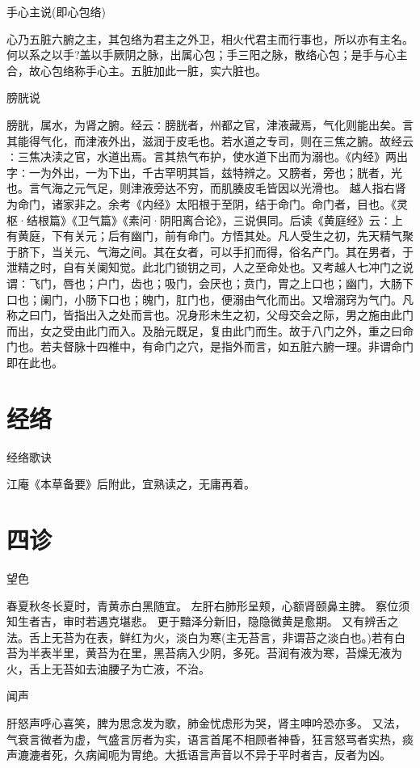 \documentclass[a4paper,12pt,UTF8,twoside]{ctexbook}
\begin{document}
	手心主说(即心包络)	
  
  心乃五脏六腑之主，其包络为君主之外卫，相火代君主而行事也，所以亦有主名。何以系之以手?盖以手厥阴之脉，出属心包；手三阳之脉，散络心包；是手与心主合，故心包络称手心主。五脏加此一脏，实六脏也。
	
	膀胱说

	膀胱，属水，为肾之腑。经云∶膀胱者，州都之官，津液藏焉，气化则能出矣。言其能得气化，而津液外出，滋润于皮毛也。若水道之专司，则在三焦之腑。故经云∶三焦决渎之官，水道出焉。言其热气布护，使水道下出而为溺也。《内经》两出字∶一为外出，一为下出，千古罕明其旨，兹特辨之。又膀者，旁也；胱者，光也。言气海之元气足，则津液旁达不穷，而肌腠皮毛皆因以光滑也。
	越人指右肾为命门，诸家非之。余考《内经》太阳根于至阴，结于命门。命门者，目也。《灵枢·结根篇》《卫气篇》《素问·阴阳离合论》，三说俱同。后读《黄庭经》云∶上有黄庭，下有关元；后有幽门，前有命门。方悟其处。凡人受生之初，先天精气聚于脐下，当关元、气海之间。其在女者，可以手扪而得，俗名产门。其在男者，于泄精之时，自有关阑知觉。此北门锁钥之司，人之至命处也。又考越人七冲门之说谓∶飞门，唇也；户门，齿也；吸门，会厌也；贲门，胃之上口也；幽门，大肠下口也；阑门，小肠下口也；魄门，肛门也，便溺由气化而出。又增溺窍为气门。凡称之曰门，皆指出入之处而言也。况身形未生之初，父母交会之际，男之施由此门而出，女之受由此门而入。及胎元既足，复由此门而生。故于八门之外，重之曰命门也。若夫督脉十四椎中，有命门之穴，是指外而言，如五脏六腑一理。非谓命门即在此也。
	
	\chapter{经络}
  经络歌诀

	江庵《本草备要》后附此，宜熟读之，无庸再着。
	
	\chapter{四诊}
	望色

	春夏秋冬长夏时，青黄赤白黑随宜。
	左肝右肺形呈颊，心额肾颐鼻主脾。
	察位须知生者吉，审时若遇克堪悲。
	更于黯泽分新旧，隐隐微黄是愈期。
	又有辨舌之法。舌上无苔为在表，鲜红为火，淡白为寒(主无苔言，非谓苔之淡白也。)若有白苔为半表半里，黄苔为在里，黑苔病入少阴，多死。苔润有液为寒，苔燥无液为火，舌上无苔如去油腰子为亡液，不治。

	闻声
  
	肝怒声呼心喜笑，脾为思念发为歌，肺金忧虑形为哭，肾主呻吟恐亦多。
	又法，气衰言微者为虚，气盛言厉者为实，语言首尾不相顾者神昏，狂言怒骂者实热，痰声漉漉者死，久病闻呃为胃绝。大抵语言声音以不异于平时者吉，反者为凶。
		
\end{document}
